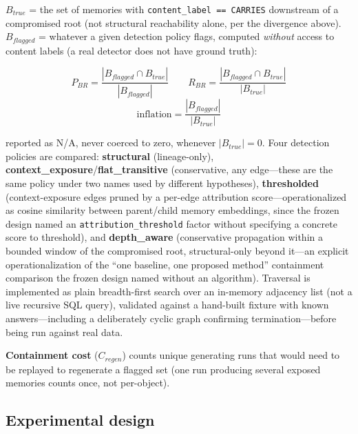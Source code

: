 $B_{true}$ = the set of memories with \texttt{content\_label == CARRIES}
downstream of a compromised root (not structural reachability alone,
per the divergence above). $B_{flagged}$ = whatever a given detection
policy flags, computed \emph{without} access to content labels (a real
detector does not have ground truth):

\begin{equation}
P_{BR} = \frac{|B_{flagged} \cap B_{true}|}{|B_{flagged}|} \qquad
R_{BR} = \frac{|B_{flagged} \cap B_{true}|}{|B_{true}|}
\end{equation}
\begin{equation}
\text{inflation} = \frac{|B_{flagged}|}{|B_{true}|}
\end{equation}

reported as N/A, never coerced to zero, whenever $|B_{true}| = 0$. Four
detection policies are compared: \textbf{structural} (lineage-only),
\textbf{context\_exposure}/\textbf{flat\_transitive} (conservative, any
edge---these are the same policy under two names used by different
hypotheses), \textbf{thresholded} (context-exposure edges pruned by a
per-edge attribution score---operationalized as cosine similarity
between parent/child memory embeddings, since the frozen design named
an \texttt{attribution\_threshold} factor without specifying a concrete
score to threshold), and \textbf{depth\_aware} (conservative
propagation within a bounded window of the compromised root,
structural-only beyond it---an explicit operationalization of the
``one baseline, one proposed method'' containment comparison the
frozen design named without an algorithm). Traversal is implemented as
plain breadth-first search over an in-memory adjacency list (not a live
recursive SQL query), validated against a hand-built fixture with known
answers---including a deliberately cyclic graph confirming
termination---before being run against real data.

\textbf{Containment cost} ($C_{regen}$) counts unique generating runs
that would need to be replayed to regenerate a flagged set (one run
producing several exposed memories counts once, not per-object).

\subsection{Experimental design}

